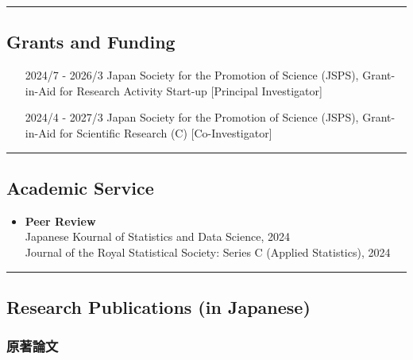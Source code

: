 \documentclass[
  12pt,
]{article}
\providecommand{\tightlist}{%
  \setlength{\itemsep}{0pt}\setlength{\parskip}{0pt}}
\begin{document}
\begin{center}\rule{0.5\linewidth}{0.5pt}\end{center}

\hypertarget{grants-and-funding}{%
\subsection{Grants and Funding}\label{grants-and-funding}}

\begin{itemize}[left=80pt, labelsep=1em, itemindent=0pt, label={}]
  \item[2024/7 - 2026/3] Japan Society for the Promotion of Science (JSPS),     
Grant-in-Aid for Research Activity Start-up [Principal Investigator]
  \item[2024/4 - 2027/3] Japan Society for the Promotion of Science (JSPS),     
Grant-in-Aid for Scientific Research (C) [Co-Investigator]
\end{itemize}

\begin{center}\rule{0.5\linewidth}{0.5pt}\end{center}

\hypertarget{academic-service}{%
\subsection{Academic Service}\label{academic-service}}

\begin{itemize}
\tightlist
\item
  \textbf{Peer Review}\\
  Japanese Kournal of Statistics and Data Science, 2024\\
  Journal of the Royal Statistical Society: Series C (Applied
  Statistics), 2024
\end{itemize}

\begin{center}\rule{0.5\linewidth}{0.5pt}\end{center}

\hypertarget{research-publications-in-japanese}{%
\subsection{Research Publications (in
Japanese)}\label{research-publications-in-japanese}}

\hypertarget{ux539fux8457ux8ad6ux6587}{%
\subsubsection{原著論文}\label{ux539fux8457ux8ad6ux6587}}
\end{document}
